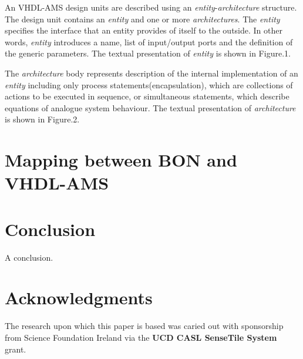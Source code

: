 \documentclass{article}
\newcommand{\ent}{\emph{entity}\xspace}
\newcommand{\arch}{\emph{architecture}\xspace}
\newcommand{\archs}{\emph{architectures}\xspace}
\begin{document}
An VHDL-AMS design units are described using an \ent-\arch structure. 
The design unit contains an \ent and one or more \archs. 
The \ent specifies the interface that an entity provides of itself 
to the outside. In other words, \ent introduces a name, list of 
input/output ports and the definition of the generic parameters. 
The textual presentation of \ent is shown in Figure.1. 

 
The \arch body represents description of the internal implementation 
of an \ent including only process statements(encapsulation), which 
are collections  of actions to be executed in sequence, or simultaneous statements, 
which describe equations of analogue system behaviour. 
The textual presentation of \arch is shown in Figure.2.


\section{Mapping between BON and VHDL-AMS}

\section{Conclusion}

A conclusion.

\section {Acknowledgments}
The research upon which this paper is based was caried out with
sponsorship from Science Foundation Ireland via the 
\textbf{UCD CASL SenseTile System} grant.




\end{document}
